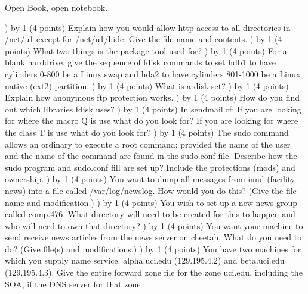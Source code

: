 
\parindent=0in
\nopagenumbers
\newcount\quesno
{}
\def\ques{\number\quesno) \advance\quesno by 1}
\def\aspace{\vskip 1.5in}

Open Book, open notebook.

\ques
(4 points)
Explain how you would allow http access to all directories in
{\ltt{}/net/u1} except for
{\ltt{}/net/u1/hide}.
Give the file name and contents.
\vskip 2.8in
\ques
(4 points)
What two things is the package tool used for?
\vskip 1.0in
\ques
(4 points)
For a blank harddrive,
give the sequence of {\ltt{}fdisk} commands to
set {\ltt{}hdb1} to have cylinders 0-800
be a Linux swap
and {\ltt{}hda2} to have cylinders 801-1000
be a Linux native (ext2)  partition.
\vskip 3.0in
\ques
(4 points)
What is a disk set?
\vskip 0.8in
\vfill\eject
\ques
(4 points)
Explain how anonymous ftp protection works.
\vskip 1.5in
\ques
(4 points)
How do you find out which libraries {\ltt{}fdisk} uses?
\vskip 0.5in
\ques
(4 points)
In {\ltt{}sendmail.cf}:
If you are looking for where the macro Q is use what do you look for?
If you are looking for where the class T is use what do you look for?
\vskip 1.2in
\ques
(4 points)
The {\ltt{}sudo} command allows an ordinary to execute a root command;
provided the name of the user and the name of the command
are found in the {\ltt{}sudo.conf} file.
Describe how the {\ltt{}sudo} program and {\ltt{}sudo.conf} fill are set up?
Include the protections (mods) and ownership.
\vskip 2.7in
\ques
(4 points)
You want to dump all messages from {\ltt{}innd} (facility {\ltt{}news})
into a file called {\ltt{}/var/log/newslog}.
How would you do this?
(Give the file name and modification.)
\vskip 1.3in
\vfill\eject
\ques
(4 points)
You wish to set up a new news group called {\ltt{}comp.476}.
What directory will need to be created for this to happen
and who will need to own that directory?
\vskip 0.5in
\ques
(4 points)
You want your machine to send receive news articles from
the news server on {\ltt{}cheetah}.
What do you need to do?
(Give file(s) and modifications.)
\vskip 1.9in
\ques
(4 points)
You have two machines for which you supply name service.
{\ltt{}alpha.uci.edu} (129.195.4.2) and 
{\ltt{}beta.uci.edu} (129.195.4.3).
Give the entire forward zone file for the zone {\ltt{}uci.edu},
including the SOA, if the DNS server for that zone
